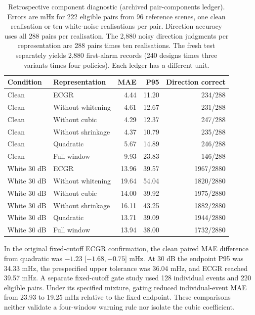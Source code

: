 \documentclass[10pt]{article}
\begin{document}
\begin{table}[htbp]\centering\small
\caption{Retrospective component diagnostic (archived pair-components ledger). Errors are mHz for 222 eligible pairs from 96 reference scenes, one clean realisation or ten white-noise realisations per pair. Direction accuracy uses all 288 pairs per realisation. The 2,880 noisy direction judgments per representation are 288 pairs times ten realisations. The fresh test separately yields 2,880 first-alarm records (240 designs times three variants times four policies). Each ledger has a different unit.}\label{tab:abl}
\begin{tabular}{llrrr}\toprule Condition & Representation & MAE & P95 & Direction correct\\\midrule
Clean & ECGR & 4.44 & 11.20 & 234/288 \\
Clean & Without whitening & 4.61 & 12.67 & 231/288 \\
Clean & Without cubic & 4.29 & 12.37 & 247/288 \\
Clean & Without shrinkage & 4.37 & 10.79 & 235/288 \\
Clean & Quadratic & 5.67 & 14.89 & 246/288 \\
Clean & Full window & 9.93 & 23.83 & 146/288 \\
White 30 dB & ECGR & 13.96 & 39.57 & 1967/2880 \\
White 30 dB & Without whitening & 19.64 & 54.04 & 1820/2880 \\
White 30 dB & Without cubic & 14.00 & 39.92 & 1975/2880 \\
White 30 dB & Without shrinkage & 16.11 & 43.25 & 1882/2880 \\
White 30 dB & Quadratic & 13.71 & 39.09 & 1944/2880 \\
White 30 dB & Full window & 13.94 & 38.00 & 1732/2880 \\
\bottomrule\end{tabular}\end{table}
In the original fixed-cutoff ECGR confirmation, the clean paired MAE difference from quadratic was $-1.23$ [$-1.68,-0.75$] mHz. At 30 dB the endpoint P95 was 34.33 mHz, the prespecified upper tolerance was 36.04 mHz, and ECGR reached 39.57 mHz. A separate fixed-cutoff gate study used 128 individual events and 220 eligible pairs. Under its specified mixture, gating reduced individual-event MAE from 23.93 to 19.25 mHz relative to the fixed endpoint. These comparisons neither validate a four-window warning rule nor isolate the cubic coefficient.
\end{document}
